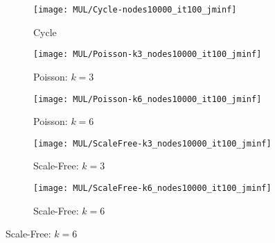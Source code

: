     \begin{figure}[H]
        \begin{minipage}{\linewidth}
            \centering
            \begin{minipage}{0.45\linewidth}
                \begin{figure}
                    \texttt{[image: MUL/Cycle-nodes10000\_it100\_jminf]}\caption{Cycle}
                    \label{fig:mul_cycle_nodes_10000}
                \end{figure}
            \end{minipage}
            \hspace{0.05\linewidth}
            \begin{minipage}{0.45\linewidth}
                \begin{figure}
                    \texttt{[image: MUL/Poisson-k3\_nodes10000\_it100\_jminf]}\caption{Poisson: $k=3$}
                    \label{fig:mul_poisson_k_3_nodes_10000}
                \end{figure}
            \end{minipage}
            \begin{minipage}{0.45\linewidth}
                \begin{figure}
                    \texttt{[image: MUL/Poisson-k6\_nodes10000\_it100\_jminf]}\caption{Poisson: $k=6$}
                    \label{fig:mul_poisson_k_6_nodes_10000}
                \end{figure}
            \end{minipage}
            \hspace{0.05\linewidth}
            \begin{minipage}{0.45\linewidth}
                \begin{figure}
                    \texttt{[image: MUL/ScaleFree-k3\_nodes10000\_it100\_jminf]}\caption{Scale-Free: $k=3$}
                    \label{fig:mul_scale_free_k_3_nodes_10000}
                \end{figure}
            \end{minipage}
            \begin{minipage}{0.45\linewidth}
                \begin{figure}
                    \texttt{[image: MUL/ScaleFree-k6\_nodes10000\_it100\_jminf]}\caption{Scale-Free: $k=6$}
                    \label{fig:mul_scale_free_k_6_nodes_10000}
                \end{figure}
            \end{minipage}

\end{minipage}
\end{figure}
